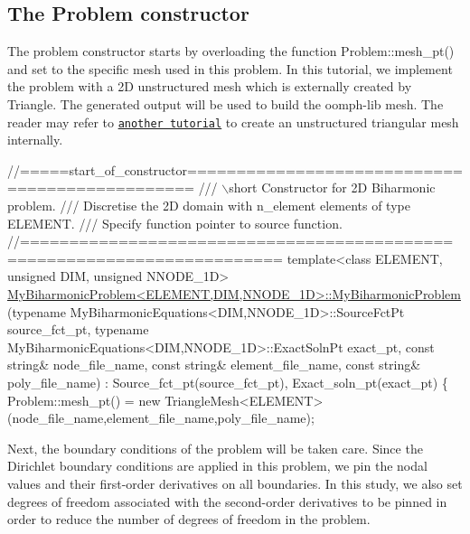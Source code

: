 \hypertarget{index_constructor}{}\subsection{The Problem constructor}\label{index_constructor}
The problem constructor starts by overloading the function {\ttfamily Problem\+::mesh\+\_\+pt()} and set to the specific mesh used in this problem. In this tutorial, we implement the problem with a 2D unstructured mesh which is externally created by {\ttfamily Triangle}. The generated output will be used to build the {\ttfamily oomph-\/lib} mesh. The reader may refer to \href{../../../meshes/mesh_from_inline_triangle/html/index.html}{\tt another tutorial} to create an unstructured triangular mesh internally.

 
\begin{DoxyCodeInclude}
\textcolor{comment}{//=====start\_of\_constructor===============================================}
\textcolor{comment}{/// \(\backslash\)short Constructor for 2D Biharmonic problem.}
\textcolor{comment}{}\textcolor{comment}{/// Discretise the 2D domain with n\_element elements of type ELEMENT.}
\textcolor{comment}{}\textcolor{comment}{/// Specify function pointer to source function. }
\textcolor{comment}{}\textcolor{comment}{//========================================================================}
\textcolor{keyword}{template}<\textcolor{keyword}{class} ELEMENT, \textcolor{keywordtype}{unsigned} DIM, \textcolor{keywordtype}{unsigned} NNODE\_1D>
\hyperlink{classMyBiharmonicProblem_ab894abf54210a71c3b4e00e1b30e380e}{MyBiharmonicProblem<ELEMENT,DIM,NNODE\_1D>::MyBiharmonicProblem}
(\textcolor{keyword}{typename} MyBiharmonicEquations<DIM,NNODE\_1D>::SourceFctPt source\_fct\_pt,
 \textcolor{keyword}{typename} MyBiharmonicEquations<DIM,NNODE\_1D>::ExactSolnPt exact\_pt,
 \textcolor{keyword}{const} \textcolor{keywordtype}{string}& node\_file\_name,
 \textcolor{keyword}{const} \textcolor{keywordtype}{string}& element\_file\_name,
 \textcolor{keyword}{const} \textcolor{keywordtype}{string}& poly\_file\_name) : 
 Source\_fct\_pt(source\_fct\_pt), Exact\_soln\_pt(exact\_pt)
\{ 
 Problem::mesh\_pt() = \textcolor{keyword}{new} TriangleMesh<ELEMENT>(node\_file\_name,element\_file\_name,poly\_file\_name);

\end{DoxyCodeInclude}


Next, the boundary conditions of the problem will be taken care. Since the Dirichlet boundary conditions are applied in this problem, we pin the nodal values and their first-\/order derivatives on all boundaries. In this study, we also set degrees of freedom associated with the second-\/order derivatives to be pinned in order to reduce the number of degrees of freedom in the problem.


